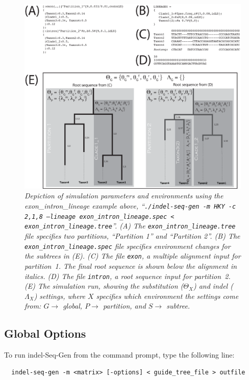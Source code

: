 \documentclass[10pt]{article}
\begin{document}
\begin{figure}
\includegraphics[width=\textwidth]{fig/general_simulation}
\caption{\textit{Depiction of simulation parameters and environments using the exon\_intron\_lineage example above, ``\texttt{./indel-seq-gen -m HKY -c 2,1,8 --lineage exon\_intron\_lineage.spec < exon\_intron\_lineage.tree}''. (A) The \texttt{exon\_intron\_lineage.tree} file specifies two partitions, ``Partition 1'' and ``Partition 2''. (B) The \texttt{exon\_intron\_lineage.spec} file specifies environment changes for the subtrees in (E). (C) The file \texttt{exon}, a multiple alignment input for partition~1. The final root sequence is shown below the alignment in italics. (D) The file \texttt{intron}, a root sequence input for partition~2. (E) The simulation run, showing the substitution ($\Theta_X$) and indel ($\Lambda_X$) settings, where $X$ specifies which environment the settings come from: $G\rightarrow$ global, $P\rightarrow$ partition, and $S\rightarrow$ subtree.}}
\label{fig:simulation_run}
\end{figure}


\subsection{Global Options}
\label{sec:global_options}
 To run indel-Seq-Gen from the command prompt, type the following line:
  
  \begin{verbatim}
  indel-seq-gen -m <matrix> [-options] < guide_tree_file > outfile
  \end{verbatim}
\end{document}
